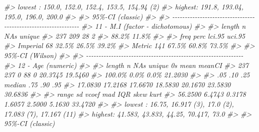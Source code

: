 \documentclass[
]{book}
\newenvironment{Shaded}{\begin{snugshade}}{\end{snugshade}}
\newcommand{\CommentTok}[1]{\textcolor[rgb]{0.56,0.35,0.01}{\textit{#1}}}
\begin{document}
\begin{Shaded}
\begin{Highlighting}[]
\CommentTok{\#\textgreater{} lowest : 150.0, 152.0, 152.4, 153.5, 154.94 (2)}
\CommentTok{\#\textgreater{} highest: 191.8, 193.04, 195.0, 196.0, 200.0}
\CommentTok{\#\textgreater{} }
\CommentTok{\#\textgreater{} \textquotesingle{} 95\%{-}CI (classic)}
\CommentTok{\#\textgreater{} }
\CommentTok{\#\textgreater{} {-}{-}{-}{-}{-}{-}{-}{-}{-}{-}{-}{-}{-}{-}{-}{-}{-}{-}{-}{-}{-}{-}{-}{-}{-}{-}{-}{-}{-}{-}{-}{-}{-}{-}{-}{-}{-}{-}{-}{-}{-}{-}{-}{-}{-}{-}{-}{-}{-}{-}{-}{-}{-}{-}{-}{-}{-}{-}{-}{-}{-}{-}{-} }
\CommentTok{\#\textgreater{} 11 {-} M.I (factor {-} dichotomous)}
\CommentTok{\#\textgreater{} }
\CommentTok{\#\textgreater{}   length      n    NAs unique}
\CommentTok{\#\textgreater{}      237    209     28      2}
\CommentTok{\#\textgreater{}           88.2\%  11.8\%       }
\CommentTok{\#\textgreater{} }
\CommentTok{\#\textgreater{}           freq   perc  lci.95  uci.95\textquotesingle{}}
\CommentTok{\#\textgreater{} Imperial    68  32.5\%   26.5\%   39.2\%}
\CommentTok{\#\textgreater{} Metric     141  67.5\%   60.8\%   73.5\%}
\CommentTok{\#\textgreater{} }
\CommentTok{\#\textgreater{} \textquotesingle{} 95\%{-}CI (Wilson)}
\CommentTok{\#\textgreater{} }
\CommentTok{\#\textgreater{} {-}{-}{-}{-}{-}{-}{-}{-}{-}{-}{-}{-}{-}{-}{-}{-}{-}{-}{-}{-}{-}{-}{-}{-}{-}{-}{-}{-}{-}{-}{-}{-}{-}{-}{-}{-}{-}{-}{-}{-}{-}{-}{-}{-}{-}{-}{-}{-}{-}{-}{-}{-}{-}{-}{-}{-}{-}{-}{-}{-}{-}{-}{-} }
\CommentTok{\#\textgreater{} 12 {-} Age (numeric)}
\CommentTok{\#\textgreater{} }
\CommentTok{\#\textgreater{}    length        n      NAs   unique       0s     mean   meanCI\textquotesingle{}}
\CommentTok{\#\textgreater{}       237      237        0       88        0  20.3745  19.5460}
\CommentTok{\#\textgreater{}             100.0\%     0.0\%              0.0\%           21.2030}
\CommentTok{\#\textgreater{}                                                                }
\CommentTok{\#\textgreater{}       .05      .10      .25   median      .75      .90      .95}
\CommentTok{\#\textgreater{}   17.0830  17.2168  17.6670  18.5830  20.1670  23.5830  30.6836}
\CommentTok{\#\textgreater{}                                                                }
\CommentTok{\#\textgreater{}     range       sd    vcoef      mad      IQR     skew     kurt}
\CommentTok{\#\textgreater{}   56.2500   6.4743   0.3178   1.6057   2.5000   5.1630  33.4720}
\CommentTok{\#\textgreater{}                                                                }
\CommentTok{\#\textgreater{} lowest : 16.75, 16.917 (3), 17.0 (2), 17.083 (7), 17.167 (11)}
\CommentTok{\#\textgreater{} highest: 41.583, 43.833, 44.25, 70.417, 73.0}
\CommentTok{\#\textgreater{} }
\CommentTok{\#\textgreater{} \textquotesingle{} 95\%{-}CI (classic)}


\end{Highlighting}
\end{Shaded}
\end{document}

